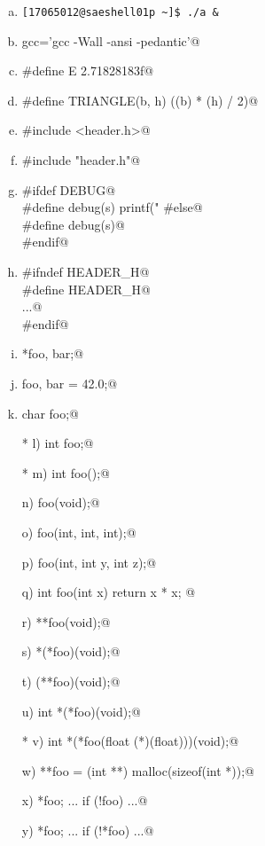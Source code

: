 \documentclass[a4paper,12pt]{article}
\begin{document}
\begin{enumerate}[a)]
	\item \texttt{[17065012@saeshell01p \textasciitilde]\$ ./a \&}
	\item \lstinline@alias gcc='gcc -Wall -ansi -pedantic'@
	\item \lstinline@#define E 2.71828183f@
	\item \lstinline@#define TRIANGLE(b, h) ((b) * (h) / 2)@
	\item \lstinline@#include <header.h>@
	\item \lstinline@#include "header.h"@
	\item \lstinline@#ifdef DEBUG@\\
	      \lstinline@        #define debug(s) printf("%s\n", s)@\\
	      \lstinline@#else@\\
	      \lstinline@        #define debug(s)@\\
	      \lstinline@#endif@
	\item \lstinline@#ifndef HEADER_H@\\
	      \lstinline@#define HEADER_H@\\
	      \lstinline@...@\\
	      \lstinline@#endif@
	\item \lstinline@int *foo, bar;@
	\item \lstinline@double foo, bar = 42.0;@
	\item \lstinline@unsigned char foo;@
	\item[* l)] \lstinline@extern int foo;@
	\item[* m)] \lstinline@extern int foo();@
	\item[n)] \lstinline@int foo(void);@
	\item[o)] \lstinline@int foo(int, int, int);@
	\item[p)] \lstinline@int foo(int, int y, int z);@
	\item[q)] \lstinline@static int foo(int x) { return x * x; }@
	\item[r)] \lstinline@int **foo(void);@
	\item[s)] \lstinline@int *(*foo)(void);@
	\item[t)] \lstinline@int (**foo)(void);@
	\item[u)] \lstinline@typedef int *(*foo)(void);@
	\item[* v)]
	      \lstinline@typedef int *(*foo(float (*)(float)))(void);@
	\item[w)] \lstinline@int **foo = (int **) malloc(sizeof(int *));@
	\item[x)] \lstinline@int *foo; ... if (!foo) ...@
	\item[y)] \lstinline@int *foo; ... if (!*foo) ...@
\end{enumerate}
\end{document}
